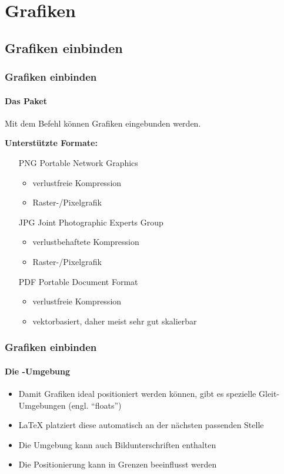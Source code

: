 \section{Grafiken}

\subsection{Grafiken einbinden}
\begin{frame}[fragile]
\frametitle{Grafiken einbinden}
\framesubtitle{Das Paket }
Mit dem Befehl  können Grafiken eingebunden werden.
\bigskip\pause

\textbf{Unterstützte Formate:}\smallskip
  \begin{itemize}
    \item[PNG] Portable Network Graphics
    \begin{itemize}
      \item verlustfreie Kompression
      \item Raster-/Pixelgrafik
    \end{itemize}\pause
    \item[JPG] Joint Photographic Experts Group
    \begin{itemize}
      \item verlustbehaftete Kompression
      \item Raster-/Pixelgrafik
    \end{itemize}\pause
    \item[PDF] Portable Document Format
    \begin{itemize}
      \item verlustfreie Kompression
      \item vektorbasiert, daher meist sehr gut skalierbar
    \end{itemize}
  \end{itemize}
\end{frame}

\begin{frame}[fragile]
\frametitle{Grafiken einbinden}
\framesubtitle{Die -Umgebung}
\begin{itemize}
    \item Damit Grafiken ideal positioniert werden können, gibt es spezielle
        Gleit-Umgebungen (engl. \enquote{floats})
    \item \LaTeX{} platziert diese automatisch an der nächsten passenden Stelle
    \item Die Umgebung kann auch Bildunterschriften enthalten
    \item Die Positionierung kann in Grenzen beeinflusst werden
\end{itemize}
\end{frame}

